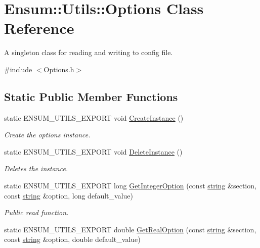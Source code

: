 \hypertarget{class_ensum_1_1_utils_1_1_options}{}\section{Ensum\+:\+:Utils\+:\+:Options Class Reference}
\label{class_ensum_1_1_utils_1_1_options}


A singleton class for reading and writing to config file.  




{\ttfamily \#include $<$Options.\+h$>$}

\subsection*{Static Public Member Functions}
\begin{DoxyCompactItemize}
\item 
static E\+N\+S\+U\+M\+\_\+\+U\+T\+I\+L\+S\+\_\+\+E\+X\+P\+O\+RT void \hyperlink{class_ensum_1_1_utils_1_1_options_a42cd72b90a957177404071c01bca1ea0}{Create\+Instance} ()
\begin{DoxyCompactList}\small\item\em Create the options instance. \end{DoxyCompactList}\item 
static E\+N\+S\+U\+M\+\_\+\+U\+T\+I\+L\+S\+\_\+\+E\+X\+P\+O\+RT void \hyperlink{class_ensum_1_1_utils_1_1_options_ace3ea5450fca95ba36201463cb47c3da}{Delete\+Instance} ()\hypertarget{class_ensum_1_1_utils_1_1_options_ace3ea5450fca95ba36201463cb47c3da}{}\label{class_ensum_1_1_utils_1_1_options_ace3ea5450fca95ba36201463cb47c3da}

\begin{DoxyCompactList}\small\item\em Deletes the instance. \end{DoxyCompactList}\item 
static E\+N\+S\+U\+M\+\_\+\+U\+T\+I\+L\+S\+\_\+\+E\+X\+P\+O\+RT long \hyperlink{class_ensum_1_1_utils_1_1_options_a784e8e989bea701170af8b689f040e90}{Get\+Integer\+Option} (const \hyperlink{class_ensum_1_1string}{string} \&section, const \hyperlink{class_ensum_1_1string}{string} \&option, long default\+\_\+value)\hypertarget{class_ensum_1_1_utils_1_1_options_a784e8e989bea701170af8b689f040e90}{}\label{class_ensum_1_1_utils_1_1_options_a784e8e989bea701170af8b689f040e90}

\begin{DoxyCompactList}\small\item\em Public read function. \end{DoxyCompactList}\item 
static E\+N\+S\+U\+M\+\_\+\+U\+T\+I\+L\+S\+\_\+\+E\+X\+P\+O\+RT double \hyperlink{class_ensum_1_1_utils_1_1_options_ac57c333c1f9bd66472fecaa8b7f55f30}{Get\+Real\+Option} (const \hyperlink{class_ensum_1_1string}{string} \&section, const \hyperlink{class_ensum_1_1string}{string} \&option, double default\+\_\+value)\hypertarget{class_ensum_1_1_utils_1_1_options_ac57c333c1f9bd66472fecaa8b7f55f30}{}\label{class_ensum_1_1_utils_1_1_options_ac57c333c1f9bd66472fecaa8b7f55f30}


\end{DoxyCompactItemize}
